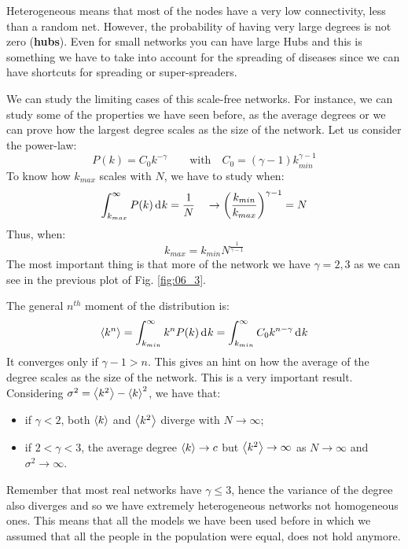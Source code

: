 \documentclass[../main/main.tex]{subfiles}
\begin{document}
Heterogeneous means that most of the nodes have a very low connectivity, less than a random net. However, the probability of having very large degrees is not zero (\textbf{hubs}). Even for small networks you can have large Hubs and this is something we have to take into account for the spreading of diseases since we can have shortcuts for spreading or super-spreaders.

We can study the limiting cases of this scale-free networks. For instance, we can study some of the properties we have seen before, as the average degrees or we can prove how the largest degree scales as the size of the network. Let us consider the power-law:
\begin{equation}
  P(k) = C_0 k^{-\gamma } \qquad \text{with} \quad C_0 = (\gamma -1  ) k_{min}^{\gamma -1 }
\end{equation}
To know how \( k_{max} \) scales with \( N \), we have to study when:
\begin{equation*}
  \int_{k_{max}}^{\infty } P(k) \dd[]{k}  = \frac{1}{N} \quad \rightarrow  \qty(\frac{k_{min}}{k_{max}})^{\gamma -1 } = N
\end{equation*}
Thus, when:
\begin{equation}
  k_{max} = k_{min} N^{\frac{1}{\gamma -1 }}
\end{equation}
The most important thing is that more of the network we have \( \gamma = 2,3  \) as we can see in the previous plot of Fig. \ref{fig:06_3}.

The general \( n^{th} \) moment of the distribution is:
\begin{equation}
  \expval{k^n} = \int_{k_{min}}^{\infty } k^n P(k) \dd[]{k} = \int_{k_{min}}^{\infty }  C_0 k^{n- \gamma  }\dd[]{k}
\end{equation}
It converges only if \( \gamma -1 > n  \). This gives an hint on how the average of the degree scales as the size of the network. This is a very important result. Considering \( \sigma ^2  = \expval{k^2} - \expval{k}^2  \), we have that:
\begin{itemize}
\item if \( \gamma <2  \), both \( \expval{k}  \) and \( \expval{k^2}  \) diverge with \( N \rightarrow  \infty  \);

\item if \( 2 < \gamma < 3  \), the average degree \( \expval{k}  \rightarrow c \) but \( \expval{k^2}  \rightarrow \infty \) as \( N \rightarrow  \infty  \) and \( \sigma ^2 \rightarrow \infty  \).
\end{itemize}
Remember that most real networks have \( \gamma \le 3 \), hence the variance of the degree also diverges and so we have extremely heterogeneous networks not homogeneous ones.
This means that all the models we have been used before in which we assumed that all the people in the population were equal, does not hold anymore.
\end{document}
